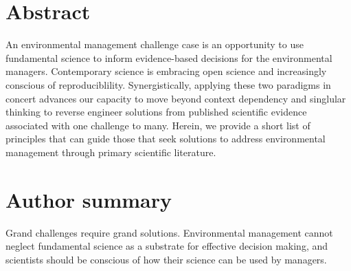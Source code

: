 \documentclass[10pt,letterpaper]{article}
\date{}
\newcommand{\getIndex}[2]{
  \ForEach{,}{\IfEq{#1}{\thislevelitem}{\number\thislevelcount\ExitForEach}{}}{#2}
}
\newcommand{\getAff}[1]{
  \getIndex{#1}{York University}
}
\begin{document}
\vspace*{0.2in}

\section*{Abstract}
An environmental management challenge case is an opportunity to use
fundamental science to inform evidence-based decisions for the
environmental managers. Contemporary science is embracing open science
and increasingly conscious of reproduciblility. Synergistically,
applying these two paradigms in concert advances our capacity to move
beyond context dependency and singlular thinking to reverse engineer
solutions from published scientific evidence associated with one
challenge to many. Herein, we provide a short list of principles that
can guide those that seek solutions to address environmental management
through primary scientific literature.

\section*{Author summary}
Grand challenges require grand solutions. Environmental management
cannot neglect fundamental science as a substrate for effective decision
making, and scientists should be conscious of how their science can be
used by managers.
\end{document}
